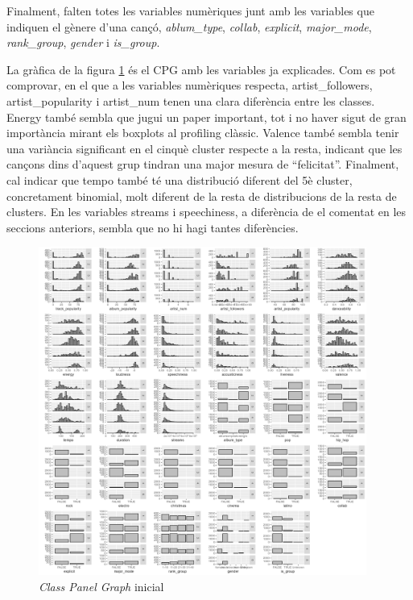 Finalment, falten totes les variables numèriques junt amb les variables que indiquen el gènere d'una cançó, \textit{ablum\_type}, \textit{collab}, \textit{explicit}, \textit{major\_mode}, \textit{rank\_group}, \textit{gender} i \textit{is\_group}.

La gràfica de la figura \ref{fig:5_TLP:CPG_og} és el CPG amb les variables ja explicades. Com es pot comprovar, en el que a les variables numèriques respecta, artist\_followers, artist\_popularity i artist\_num tenen una clara diferència entre les classes. Energy també sembla que jugui un paper important, tot i no haver sigut de gran importància mirant els boxplots al profiling clàssic. Valence també sembla tenir una variància significant en el cinquè cluster respecte a la resta, indicant que les cançons dins d'aquest grup tindran una major mesura de ``felicitat''. Finalment, cal indicar que tempo també té una distribució diferent del 5è cluster, concretament binomial, molt diferent de la resta de distribucions de la resta de clusters. En les variables streams i speechiness, a diferència de el comentat en les seccions anteriors, sembla que no hi hagi tantes diferències.

\begin{figure}[H] 
    \centering
    \includegraphics[width=0.96\textwidth]{Images/5_TLP/CPG.png}
    \caption{\emph{Class Panel Graph} inicial}
    \label{fig:5_TLP:CPG_og}
\end{figure}


